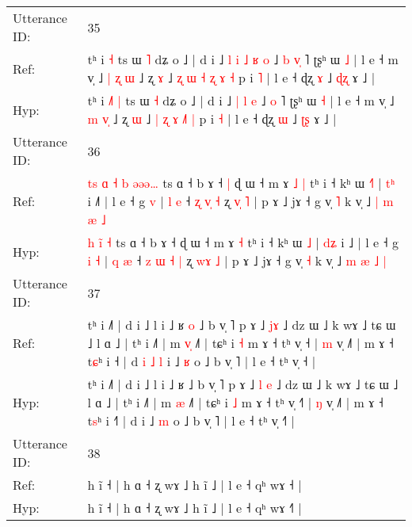 \documentclass[10pt]{article}
\DeclareRobustCommand{\hl}[1]{{\textcolor{red}{#1}}}
\begin{document}
\begin{longtable}{ll}
Utterance ID: & 35 \\
Ref: & tʰ i\hl{}\hl{}\hl{} \hl{˧} ts ɯ \hl{˥} dʑ o ˩ | d i ˩\hl{ }\hl{l}\hl{ }\hl{i} \hl{˩} \hl{ʁ} \hl{o} ˩\hl{ }\hl{b} \hl{v}\hl{̩} ˥ ʈʂʰ ɯ \hl{˩} | l e ˧ m v̩ ˩ \hl{|} \hl{ʐ}\hl{ }\hl{ɯ} ˩ ʐ \hl{ɤ} ˩ \hl{ʐ} \hl{ɯ} \hl{˧} \hl{ʐ}\hl{ }\hl{ɤ} \hl{˧} p i \hl{˥} | l e ˧ ɖʐ \hl{ɤ} ˩ \hl{ɖ}\hl{ʐ} ɤ ˩ |
 \\
Hyp: & tʰ i\hl{ }\hl{˩}\hl{˥} \hl{|} ts ɯ \hl{˧} dʑ o ˩ | d i ˩\hl{}\hl{}\hl{}\hl{} \hl{|} \hl{l} \hl{e} ˩\hl{}\hl{} \hl{}\hl{o} ˥ ʈʂʰ ɯ \hl{˧} | l e ˧ m v̩ ˩ \hl{m} \hl{}\hl{v}\hl{̩} ˩ ʐ \hl{ɯ} ˩ \hl{|} \hl{ʐ} \hl{ɤ} \hl{}\hl{˩}\hl{˥} \hl{|} p i \hl{˧} | l e ˧ ɖʐ \hl{ɯ} ˩ \hl{ʈ}\hl{ʂ} ɤ ˩ |
 \\
\midrule
Utterance ID: & 36 \\
Ref: & \hl{t}\hl{s}\hl{ }\hl{ɑ} \hl{˧}\hl{ }\hl{b} \hl{ə}\hl{ə}\hl{ə}\hl{…} ts ɑ ˧ b ɤ ˧\hl{ }\hl{|} ɖ ɯ ˧ m ɤ\hl{ }\hl{˩} \hl{|} tʰ i ˧ kʰ ɯ \hl{˧}\hl{˥} | \hl{t}\hl{ʰ} i ˩\hl{˥} | l e ˧ g\hl{}\hl{} \hl{v} | \hl{l} \hl{e} ˧ \hl{ʐ} \hl{}\hl{v}\hl{̩} \hl{˧} ʐ \hl{v}\hl{̩} \hl{˥} | p ɤ ˩ jɤ ˧ g v̩ \hl{˥} k v̩ ˩ \hl{|} \hl{m} \hl{æ} \hl{˩}
 \\
Hyp: & \hl{}\hl{}\hl{}\hl{h} \hl{}\hl{i}\hl{̃} \hl{}\hl{}\hl{}\hl{˧} ts ɑ ˧ b ɤ ˧\hl{}\hl{} ɖ ɯ ˧ m ɤ\hl{}\hl{} \hl{˧} tʰ i ˧ kʰ ɯ \hl{}\hl{˩} | \hl{d}\hl{ʑ} i ˩\hl{} | l e ˧ g\hl{ }\hl{i} \hl{˧} | \hl{q} \hl{æ} ˧ \hl{z} \hl{ɯ}\hl{ }\hl{˧} \hl{|} ʐ \hl{w}\hl{ɤ} \hl{˩} | p ɤ ˩ jɤ ˧ g v̩ \hl{˧} k v̩ ˩ \hl{m} \hl{æ} \hl{˩} \hl{|}
 \\
\midrule
Utterance ID: & 37 \\
Ref: & tʰ i ˩˥ | d i ˩ l i ˩ ʁ\hl{ }\hl{o} ˩ b v̩ ˥ p ɤ ˩ \hl{}\hl{j}\hl{ɤ} ˩ dz ɯ ˩ k wɤ ˩ tɕ ɯ ˩ l ɑ ˩ | tʰ i ˩˥ | m \hl{v}\hl{̩} ˩˥ | tɕʰ i \hl{˧} m ɤ ˧ tʰ v̩ ˧\hl{} | \hl{m} v̩ ˩˥ | m ɤ ˧ t\hl{ɕ}ʰ i ˧\hl{} | d\hl{ }\hl{i}\hl{ }\hl{˩}\hl{ }\hl{l} i ˩ \hl{ʁ} o ˩ b v̩ ˥ | l e ˧ tʰ v̩ ˧\hl{} |
 \\
Hyp: & tʰ i ˩˥ | d i ˩ l i ˩ ʁ\hl{}\hl{} ˩ b v̩ ˥ p ɤ ˩ \hl{l}\hl{ }\hl{e} ˩ dz ɯ ˩ k wɤ ˩ tɕ ɯ ˩ l ɑ ˩ | tʰ i ˩˥ | m \hl{}\hl{æ} ˩˥ | tɕʰ i \hl{˩} m ɤ ˧ tʰ v̩ ˧\hl{˥} | \hl{ŋ} v̩ ˩˥ | m ɤ ˧ t\hl{s}ʰ i ˧\hl{˥} | d\hl{}\hl{}\hl{}\hl{}\hl{}\hl{} i ˩ \hl{m} o ˩ b v̩ ˥ | l e ˧ tʰ v̩ ˧\hl{˥} |
 \\
\midrule
Utterance ID: & 38 \\
Ref: & h ĩ ˧ | h ɑ ˧ ʐ wɤ ˩ h ĩ ˩ | l e ˧ qʰ wɤ ˧\hl{} |
 \\
Hyp: & h ĩ ˧ | h ɑ ˧ ʐ wɤ ˩ h ĩ ˩ | l e ˧ qʰ wɤ ˧\hl{˥} |
 \\
\midrule

\end{longtable}
\end{document}
